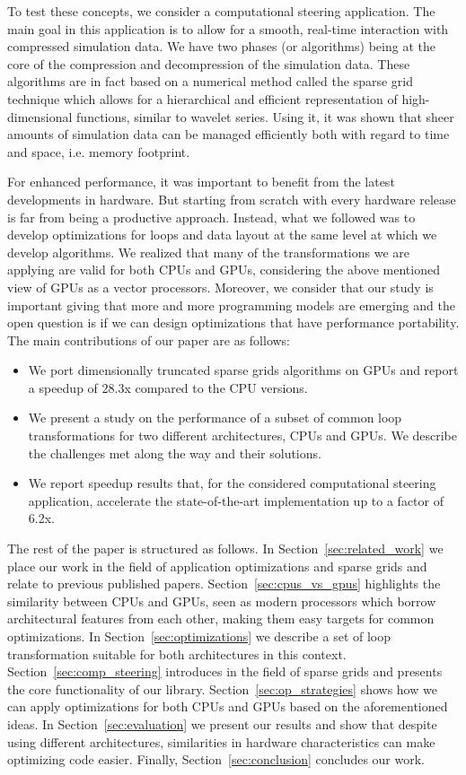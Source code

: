 To test these concepts, we consider a computational steering application. The
main goal in this application is to allow for a smooth, real-time interaction
with compressed simulation data. We have two phases (or algorithms) being at the
core of the compression and decompression of the simulation data. These
algorithms are in fact based on a numerical method called the sparse grid
technique which allows for a hierarchical and efficient representation of
high-dimensional functions, similar to wavelet series. Using it, it was shown
that sheer amounts of simulation data can be managed efficiently both with
regard to time and space, i.e. memory footprint.

For enhanced performance, it was important to benefit from the latest
developments in hardware. But starting from scratch with every hardware release
is far from being a productive approach. Instead, what we followed was to
develop optimizations for loops and data layout at the same level at which we
develop algorithms. We realized that many of the transformations we are applying
are valid for both CPUs and GPUs, considering the above mentioned view of GPUs
as a vector processors. Moreover, we consider that our study is important giving
that more and more programming models are emerging and the open question is if
we can design optimizations that have performance portability. The main
contributions of our paper are as follows:

\begin{itemize}
  \item We port dimensionally truncated sparse grids algorithms on GPUs and
  report a speedup of 28.3x compared to the CPU versions.
  \item We present a study on the performance of a subset of common loop
  transformations for two different architectures, CPUs and GPUs. We describe
  the challenges met along the way and their solutions.
  \item We report speedup results that, for the considered computational
  steering application, accelerate the state-of-the-art implementation up to a
  factor of 6.2x.
\end{itemize}

The rest of the paper is structured as follows. In
Section~\ref{sec:related_work} we place our work in the field of application
optimizations and sparse grids and relate to previous published papers.
Section~\ref{sec:cpus_vs_gpus} highlights the similarity between CPUs and GPUs,
seen as modern processors which borrow architectural features from each other,
making them easy targets for common optimizations.
In Section~\ref{sec:optimizations} we describe a set of loop transformation
suitable for both architectures in this context. Section~\ref{sec:comp_steering}
introduces in the field of sparse grids and presents the core functionality of
our library. Section~\ref{sec:op_strategies} shows how we can apply
optimizations for both CPUs and GPUs based on the aforementioned ideas. In
Section~\ref{sec:evaluation} we present our results and show that despite using
different architectures, similarities in hardware characteristics can make
optimizing code easier. Finally, Section~\ref{sec:conclusion} concludes our
work.
